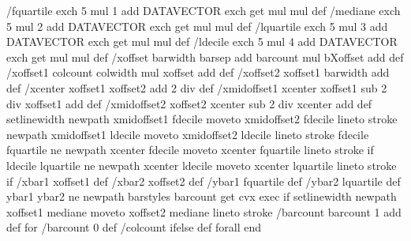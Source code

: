 {{{{						/fquartile exch 5 mul 1 add DATAVECTOR exch get \psbar@psop \psbar@mul mul \pst@number\pst@dimb mul def
						/mediane exch 5 mul 2 add DATAVECTOR exch get \psbar@psop \psbar@mul mul \pst@number\pst@dimb mul def
						/lquartile exch 5 mul 3 add DATAVECTOR exch get \psbar@psop \psbar@mul mul \pst@number\pst@dimb mul def
						/ldecile exch 5 mul 4 add DATAVECTOR exch get \psbar@psop \psbar@mul mul \pst@number\pst@dimb mul def
						/xoffset barwidth barsep add barcount mul bXoffset add def
						/xoffset1 colcount colwidth mul xoffset add def
						/xoffset2 xoffset1 barwidth add def
						/xcenter xoffset1 xoffset2 add 2 div def
						/xmidoffset1 xcenter xoffset1 sub 2 div xoffset1 add def
						/xmidoffset2 xoffset2 xcenter sub 2 div xcenter add def
						\pst@number{\myps@whiskerwidth} setlinewidth
						newpath
						xmidoffset1 fdecile moveto
						xmidoffset2 fdecile lineto
						stroke
						newpath
						xmidoffset1 ldecile moveto
						xmidoffset2 ldecile lineto
						stroke
						fdecile fquartile ne {  %
							newpath
							xcenter fdecile moveto
							xcenter fquartile lineto
							stroke
						} if
						ldecile lquartile ne {  %
							newpath
							xcenter ldecile moveto
							xcenter lquartile lineto
							stroke
						} if
						/xbar1 xoffset1 def
						/xbar2 xoffset2 def
						/ybar1 fquartile def
						/ybar2 lquartile def
						ybar1 ybar2 ne {  %
							newpath
							barstyles barcount get cvx exec
						} if
						\pst@number{\myps@medianwidth} setlinewidth
						newpath
						xoffset1 mediane moveto
						xoffset2 mediane lineto
						stroke
						/barcount barcount 1 add def
					} for
					/barcount 0 def
					/colcount \pst@tempc{} ifelse def
				} forall
				end
			}%
		\else%
			\@ehpa%
		\fi%
		\ifx\psk@orientation\z@%
			\pstbar@xlabels%
		\else
			\pstbar@ylabels%
		\fi
	\end@SpecialObj%
}%

